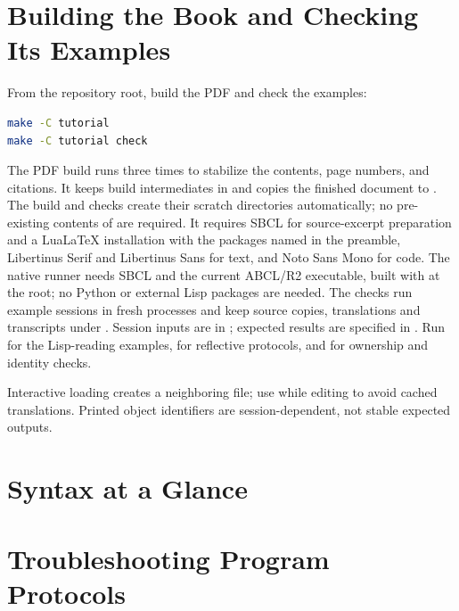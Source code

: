 \appendix
\section{Building the Book and Checking Its Examples}
\label{sec:book-build}

From the repository root, build the PDF and check the examples:

\begin{lstlisting}[language=bash]
make -C tutorial
make -C tutorial check
\end{lstlisting}

The PDF build runs  three times to stabilize the contents,
page numbers, and citations.
It keeps build intermediates in  and
copies the finished document to .
The build and checks create their scratch directories automatically;
no pre-existing contents of  are required.
It requires SBCL for source-excerpt preparation and a LuaLaTeX installation
with the packages named in the preamble,
Libertinus Serif and Libertinus Sans for text, and Noto Sans Mono for code.
The native runner  needs SBCL and
the current ABCL/R2 executable, built with  at the root;
no Python or external Lisp packages are needed.
The checks run example sessions in fresh processes and keep source copies,
translations and transcripts under .
Session inputs are in ; expected
results are specified in .
Run  for the Lisp-reading examples,
 for reflective protocols, and
 for ownership and identity checks.

Interactive loading creates a neighboring  file; use
 while editing to avoid cached translations.
Printed object identifiers are session-dependent, not stable expected outputs.



\section{Syntax at a Glance}
\label{sec:syntax}


\section{Troubleshooting Program Protocols}
\label{sec:failures}

